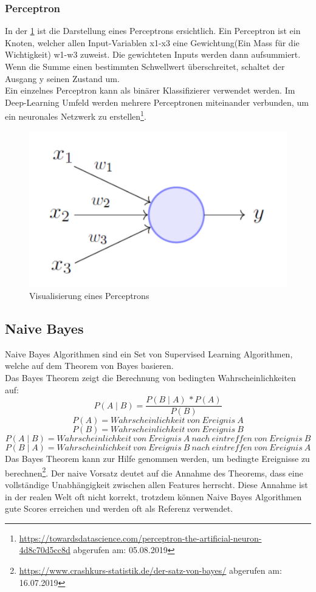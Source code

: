 \subsubsection{Perceptron}
In der \cref{fig:perceptron-grafik} ist die Darstellung eines Perceptrons ersichtlich.
Ein Perceptron ist ein Knoten, welcher allen Input-Variablen \glqq x1-x3\grqq{} eine Gewichtung(Ein Mass für die Wichtigkeit) \glqq w1-w3\grqq{} zuweist.
Die gewichteten Inputs werden dann aufsummiert.
Wenn die Summe einen bestimmten Schwellwert überschreitet, schaltet der Ausgang \glqq y\grqq{} seinen Zustand um.\\
Ein einzelnes Perceptron kann als binärer Klassifizierer verwendet werden.
Im Deep-Learning Umfeld werden mehrere Perceptronen miteinander verbunden, um ein neuronales Netzwerk zu erstellen\footnote{\url{https://towardsdatascience.com/perceptron-the-artificial-neuron-4d8c70d5cc8d} abgerufen am: 05.08.2019}.
\begin{figure}[H]
	\centering	
	\includegraphics[width=0.6\columnwidth,keepaspectratio]{img/perceptron.png}
	\caption{Visualisierung eines Perceptrons}
	\label{fig:perceptron-grafik}
\end{figure}
\subsection{Naive Bayes}
Naive Bayes Algorithmen sind ein Set von Supervised Learning Algorithmen, welche auf dem Theorem von Bayes basieren.\\
Das Bayes Theorem zeigt die Berechnung von bedingten Wahrscheinlichkeiten auf:
$$ P(A \mid B) = \frac{P(B \mid A) \,* P(A)}{P(B)} $$
$$ P(A) = Wahrscheinlichkeit\ von\ Ereignis\ A$$
$$ P(B) = Wahrscheinlichkeit\ von\ Ereignis\ B$$
$$ P(A \mid B) = Wahrscheinlichkeit\ von\ Ereignis\ A\ nach\ eintreffen\ von\ Ereignis\ B$$
$$ P(B \mid A) = Wahrscheinlichkeit\ von\ Ereignis\ B\ nach\ eintreffen\ von\ Ereignis\ A$$
Das Bayes Theorem kann zur Hilfe genommen werden, um bedingte Ereignisse zu berechnen\footnote{\url{https://www.crashkurs-statistik.de/der-satz-von-bayes/} abgerufen am: 16.07.2019}.
Der naive Vorsatz deutet auf die Annahme des Theorems, dass eine vollständige Unabhängigkeit zwischen allen Features herrscht.
Diese Annahme ist in der realen Welt oft nicht korrekt, trotzdem können Naive Bayes Algorithmen gute Scores erreichen und werden oft als Referenz verwendet. \cite{rennie2003tackling}
